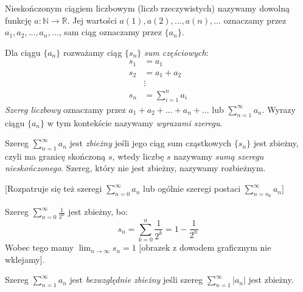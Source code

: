 \begin{definition}
	Nieskończonym ciągiem liczbowym (liczb rzeczywistych) nazywamy dowolną funkcję $a: \mathbb{N} \rightarrow \mathbb{R}$. Jej wartości $a(1), a(2), ..., a(n), ...$ oznaczamy przez $a_1, a_2, ..., a_n, ...$, sam ciąg oznaczamy przez $\{a_n\}$.
\end{definition}

\begin{definition}
	Dla ciągu $\{a_n\}$ rozważamy ciąg $\{s_n\}$ \textit{sum częściowych}:
	\begin{align*}
		s_1 & =  a_1              \\
		s_2 & =  a_1 + a_2        \\
		    & \vdots              \\
		s_n & =  \sum_{i=1}^n a_i
	\end{align*}
	\textit{Szereg liczbowy} oznaczamy przez $a_1 + a_2 + ... + a_n + ...$ lub $\sum_{n=1}^\infty a_n$. Wyrazy ciągu $\{a_n\}$ w tym kontekście nazywamy \textit{wyrazami szeregu}.
\end{definition}

\begin{definition}
	Szereg $\sum_{n=1}^\infty a_n$ jest \textit{zbieżny} jeśli jego ciąg sum cząstkowych $\{s_n\}$ jest zbieżny, czyli ma granicę skończoną $s$, wtedy liczbę $s$ nazywamy \textit{sumą szeregu nieskończonego}. Szereg, który nie jest zbieżny, nazywamy rozbieżnym.
\end{definition}

[Rozpatruje się też szeregi $\sum_{n=0}^\infty a_n$ lub ogólnie szeregi postaci $\sum_{n=n_0}^\infty a_n$]

\begin{example}
	Szereg $\sum_{n=0}^\infty \frac{1}{2^n}$ jest zbieżny, bo:
	$$s_n = \sum_{k=0}^n \frac{1}{2^k} = 1 - \frac{1}{2^n}$$
	Wobec tego mamy $\lim_{n\to\infty}{s_n} = 1$
	[obrazek z dowodem graficznym nie wklejamy].
\end{example}

\begin{definition}
	Szereg $\sum_{n=1}^\infty a_n$ jest \textit{bezwzględnie zbieżny} jeśli szereg $\sum_{n=1}^\infty |a_n|$ jest zbieżny.
\end{definition} \newpage